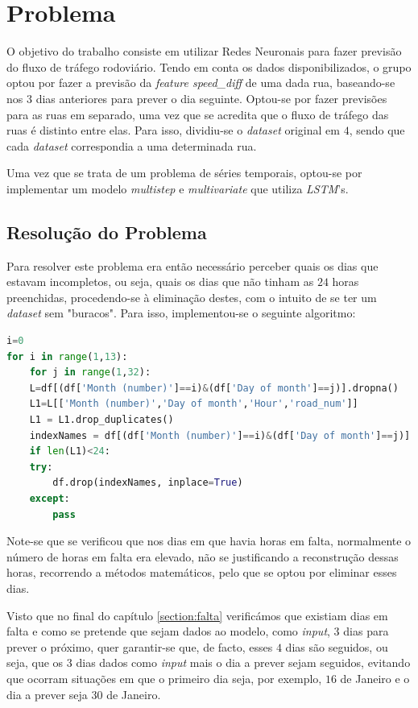 \documentclass[a4paper, 12pt]{article}
\begin{document}
\section{Problema}

O objetivo do trabalho consiste em utilizar Redes Neuronais para fazer previsão do fluxo de tráfego rodoviário. Tendo em conta os dados disponibilizados, o grupo optou por fazer a previsão da \textit{feature speed\_diff} de uma dada rua, baseando-se nos $3$ dias anteriores para prever o dia seguinte. Optou-se por fazer previsões para as ruas em separado, uma vez que se acredita que o fluxo de tráfego das ruas é distinto entre elas. Para isso, dividiu-se o \textit{dataset} original em $4$, sendo que cada \textit{dataset} correspondia a uma determinada rua.

Uma vez que se trata de um problema de séries temporais, optou-se por implementar um modelo \textit{multistep} e \textit{multivariate} que utiliza \textit{LSTM}'s.

\subsection{Resolução do Problema}

Para resolver este problema era então necessário perceber quais os dias que estavam incompletos, ou seja, quais os dias que não tinham as $24$ horas preenchidas, procedendo-se à eliminação destes, com o intuito de se ter um \textit{dataset} sem "buracos". Para isso, implementou-se o seguinte algoritmo:

\begin{lstlisting}[language=Python]
i=0
for i in range(1,13):
	for j in range(1,32):
	L=df[(df['Month (number)']==i)&(df['Day of month']==j)].dropna()
	L1=L[['Month (number)','Day of month','Hour','road_num']]
	L1 = L1.drop_duplicates()
	indexNames = df[(df['Month (number)']==i)&(df['Day of month']==j)].index
	if len(L1)<24:
	try:
		df.drop(indexNames, inplace=True)
	except:
		pass
\end{lstlisting}

Note-se que se verificou que nos dias em que havia horas em falta, normalmente o número de horas em falta era elevado, não se justificando a reconstrução dessas horas, recorrendo a métodos matemáticos, pelo que se optou por eliminar esses dias.

Visto que no final do capítulo \ref{section:falta} verificámos que existiam dias em falta e como se pretende que sejam dados ao modelo, como \textit{input}, $3$ dias para prever o próximo, quer garantir-se que, de facto, esses $4$ dias são seguidos, ou seja, que os $3$ dias dados como \textit{input} mais o dia a prever sejam seguidos, evitando que ocorram situações em que o primeiro dia seja, por exemplo, $16$ de Janeiro e o dia a prever seja $30$ de Janeiro.
\end{document}
